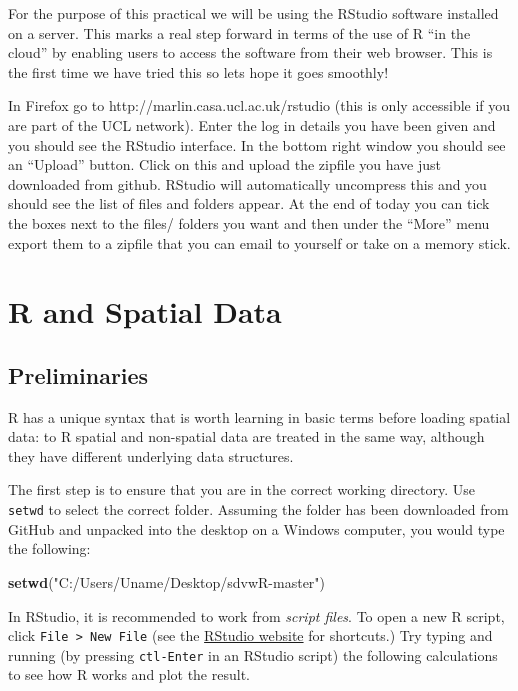 \documentclass[]{article}
\newenvironment{Shaded}{}{}
\newcommand{\KeywordTok}[1]{\textcolor[rgb]{0.00,0.44,0.13}{\textbf{{#1}}}}
\newcommand{\StringTok}[1]{\textcolor[rgb]{0.25,0.44,0.63}{{#1}}}
\newcommand{\NormalTok}[1]{{#1}}
\begin{document}
For the purpose of this practical we will be using the RStudio software
installed on a server. This marks a real step forward in terms of the
use of R ``in the cloud'' by enabling users to access the software from
their web browser. This is the first time we have tried this so lets
hope it goes smoothly!

In Firefox go to http://marlin.casa.ucl.ac.uk/rstudio (this is only
accessible if you are part of the UCL network). Enter the log in details
you have been given and you should see the RStudio interface. In the
bottom right window you should see an ``Upload'' button. Click on this
and upload the zipfile you have just downloaded from github. RStudio
will automatically uncompress this and you should see the list of files
and folders appear. At the end of today you can tick the boxes next to
the files/ folders you want and then under the ``More'' menu export them
to a zipfile that you can email to yourself or take on a memory stick.

\section{R and Spatial Data}

\subsection{Preliminaries}

R has a unique syntax that is worth learning in basic terms before
loading spatial data: to R spatial and non-spatial data are treated in
the same way, although they have different underlying data structures.

The first step is to ensure that you are in the correct working
directory. Use \texttt{setwd} to select the correct folder. Assuming the
folder has been downloaded from GitHub and unpacked into the desktop on
a Windows computer, you would type the following:

\begin{Shaded}
\begin{Highlighting}[]
\KeywordTok{setwd}\NormalTok{(}\StringTok{"C:/Users/Uname/Desktop/sdvwR-master"}\NormalTok{)}
\end{Highlighting}
\end{Shaded}
In RStudio, it is recommended to work from \emph{script files}. To open
a new R script, click \texttt{File \textgreater{} New File} (see the
\href{http://www.rstudio.com/ide/docs/using/keyboard\_shortcuts}{RStudio
website} for shortcuts.) Try typing and running (by pressing
\texttt{ctl-Enter} in an RStudio script) the following calculations to
see how R works and plot the result.
\end{document}
